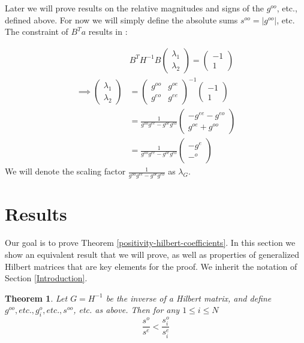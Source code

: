 \documentclass[11pt]{article}
\newtheorem{thm}{Theorem}[section]
\theoremstyle{definition}
\theoremstyle{remark}
\numberwithin{equation}{section}
\begin{document}
Later we will prove results on the relative magnitudes and signs of the $g^{oo}$, etc., defined above. For now we will simply define the absolute sums $s^{oo} = | g^{oo}|$, etc.\\

The constraint of $B^Ta$ results in :

\begin{align*}
& B^T H^{-1} B \begin{pmatrix}\lambda_1 \\ \lambda_2 \end{pmatrix} = \begin{pmatrix} -1 \\ 1 \end{pmatrix}\\
\implies \begin{pmatrix} \lambda_1 \\ \lambda_2 \end{pmatrix} &= \begin{pmatrix} g^{oo} & g^{oe} \\ g^{eo} & g^{ee} \end{pmatrix}^{-1} \begin{pmatrix} -1 \\ 1 \end{pmatrix}\\
&= \frac{1}{g^{oo} g^{ee} - g^{oe}g^{eo}} \begin{pmatrix} -g^{ee} - g^{eo} \\ g^{oe} + g^{oo} \end{pmatrix}\\
&= \frac{1}{g^{oo} g^{ee} - g^{oe}g^{eo}} \begin{pmatrix} -g^e \\ -^o \end{pmatrix}
\end{align*}
We will denote the scaling factor $\frac{1}{g^{oo} g^{ee} - g^{oe}g^{eo}}$ as $\lambda_G$. 


\section{Results} 

Our goal is to prove Theorem \ref{positivity-hilbert-coefficients}. In this section we show an equivalent result that we will prove, as well as properties of generalized Hilbert matrices that are key elements for the proof. We inherit the notation of Section \ref{Introduction}.

\begin{thm}\label{ratio-of-sums-equivalent-theorem}
Let $G=H^{-1}$ be the inverse of a Hilbert matrix, and define $g^{oo}, etc., g^{o}_i, etc., s^{oo}$, etc. as above. Then for any $1 \le i \le N$
\begin{equation}\label{ratio-of-sums}
\frac{s^o}{s^e} < \frac{s_i^o}{s_i^e}
\end{equation}
\end{thm}
\end{document}

